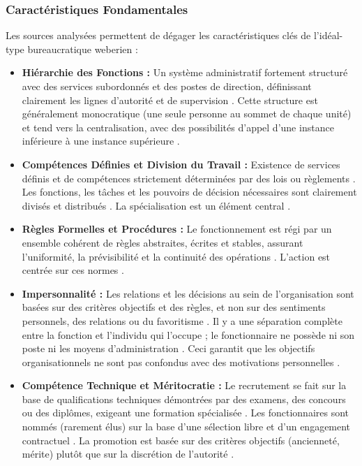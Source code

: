 \documentclass[10pt, twocolumn]{article}
\begin{document}
\subsubsection{Caractéristiques Fondamentales}
Les sources analysées \citep{Serpa2019, Weber1922, Laguito2024, Hussain2019, RedfameIJSSS, Jaelani2024} permettent de dégager les caractéristiques clés de l'idéal-type bureaucratique weberien :
\begin{itemize}
    \item \textbf{Hiérarchie des Fonctions :} Un système administratif fortement structuré avec des services subordonnés et des postes de direction, définissant clairement les lignes d'autorité et de supervision \citep{Weber1922, Hussain2019, RedfameIJSSS}. Cette structure est généralement monocratique (une seule personne au sommet de chaque unité) et tend vers la centralisation, avec des possibilités d'appel d'une instance inférieure à une instance supérieure \citep{Weber1922}.
    \item \textbf{Compétences Définies et Division du Travail :} Existence de services définis et de compétences strictement déterminées par des lois ou règlements \citep{Weber1922}. Les fonctions, les tâches et les pouvoirs de décision nécessaires sont clairement divisés et distribués \citep{Weber1922}. La spécialisation est un élément central \citep{Weber1922, Hussain2019}.
    \item \textbf{Règles Formelles et Procédures :} Le fonctionnement est régi par un ensemble cohérent de règles abstraites, écrites et stables, assurant l'uniformité, la prévisibilité et la continuité des opérations \citep{Serpa2019, Weber1922, Laguito2024, Hussain2019, RedfameIJSSS}. L'action est centrée sur ces normes \citep{Serpa2019}.
    \item \textbf{Impersonnalité :} Les relations et les décisions au sein de l'organisation sont basées sur des critères objectifs et des règles, et non sur des sentiments personnels, des relations ou du favoritisme \citep{Weber1922, Laguito2024, RedfameIJSSS}. Il y a une séparation complète entre la fonction et l'individu qui l'occupe ; le fonctionnaire ne possède ni son poste ni les moyens d'administration \citep{Weber1922}. Ceci garantit que les objectifs organisationnels ne sont pas confondus avec des motivations personnelles \citep{Weber1922}.
    \item \textbf{Compétence Technique et Méritocratie :} Le recrutement se fait sur la base de qualifications techniques démontrées par des examens, des concours ou des diplômes, exigeant une formation spécialisée \citep{Weber1922, Hussain2019}. Les fonctionnaires sont nommés (rarement élus) sur la base d'une sélection libre et d'un engagement contractuel \citep{Weber1922}. La promotion est basée sur des critères objectifs (ancienneté, mérite) plutôt que sur la discrétion de l'autorité \citep{Weber1922}.

\end{itemize}
\end{document}
